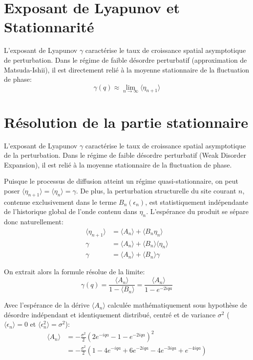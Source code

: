 \section{Exposant de Lyapunov et Stationnarité}
L'exposant de Lyapunov $\gamma$ caractérise le taux de croissance spatial asymptotique de perturbation. Dans le régime de faible désordre perturbatif (approximation de Matsuda-Ishii), il est directement relié à la moyenne stationnaire de la fluctuation de phase:
\begin{equation}
    \gamma(q) \approx \lim_{n \to \infty} \langle \eta_{n+1} \rangle
\end{equation}

\section{Résolution de la partie stationnaire}
L'exposant de Lyapunov $\gamma$ caractérise le taux de croissance spatial asymptotique de la perturbation. Dans le régime de faible désordre perturbatif (Weak Disorder Expansion), il est relié à la moyenne stationnaire de la fluctuation de phase.

Puisque le processus de diffusion atteint un régime quasi-stationnaire, on peut poser $\langle \eta_{n+1} \rangle = \langle \eta_n \rangle = \gamma$.
De plus, la perturbation structurelle du site courant $n$, contenue exclusivement dans le terme $B_n(\epsilon_n)$, est statistiquement indépendante de l'historique global de l'onde contenu dans $\eta_n$. L'espérance du produit se sépare donc naturellement:
\begin{align}
    \langle \eta_{n+1} \rangle &= \langle A_n \rangle + \langle B_n \eta_n \rangle \\
    \gamma &= \langle A_n \rangle + \langle B_n \rangle \langle \eta_n \rangle \\
    \gamma &= \langle A_n \rangle + \langle B_n \rangle \gamma
\end{align}

On extrait alors la formule résolue de la limite:
\begin{equation}
    \gamma(q) = \frac{\langle A_n \rangle}{1 - \langle B_n \rangle} = \frac{\langle A_n \rangle}{1 - e^{-2iqa}}
\end{equation}

Avec l'espérance de la dérive $\langle A_n \rangle$ calculée mathématiquement sous hypothèse de désordre indépendant et identiquement distribué, centré et de variance $\sigma^2$ ($\langle \epsilon_n \rangle = 0$ et $\langle \epsilon_n^2 \rangle = \sigma^2$):
\begin{align}
    \langle A_n \rangle &= - \frac{\sigma^2}{2} {\left(2e^{-iqa} - 1 - e^{-2iqa}\right)}^2 \\
    &= - \frac{\sigma^2}{2} \left( 1 - 4e^{-iqa} + 6e^{-2iqa} - 4e^{-3iqa} + e^{-4iqa} \right)
\end{align}

